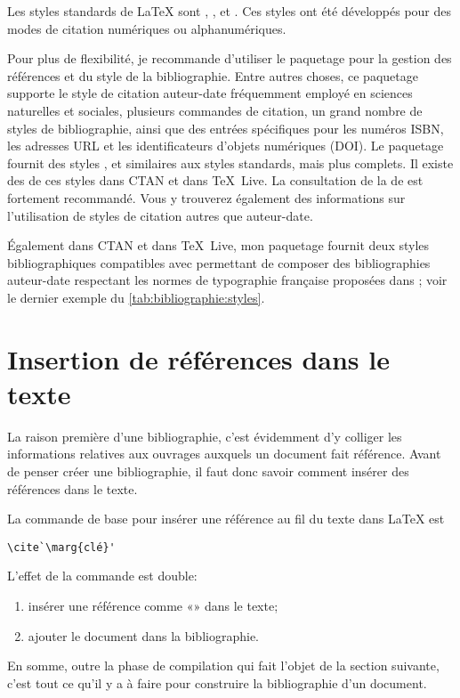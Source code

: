 Les styles standards de {\LaTeX} sont , ,
 et . Ces styles ont été développés pour des
modes de citation numériques ou alphanumériques.

Pour plus de flexibilité, je recommande d'utiliser le paquetage
 pour la gestion des références et du style de la
bibliographie. Entre autres choses, ce paquetage supporte le style de
citation auteur-date fréquemment employé en sciences naturelles et
sociales, plusieurs commandes de citation, un grand nombre de styles
de bibliographie, ainsi que des entrées spécifiques pour les numéros
ISBN, les adresses URL et les identificateurs d'objets numériques
(DOI). Le paquetage fournit des styles ,
 et  similaires aux styles standards,
mais plus complets. Il existe des %
de ces styles dans CTAN et dans {\TeX}~Live. La consultation de la %
de  est fortement recommandé. Vous y trouverez également
des informations sur l'utilisation de styles de citation autres que
auteur-date.

Également dans CTAN et dans {\TeX}~Live, mon paquetage
 \citep{francais-bst} fournit deux styles
bibliographiques compatibles avec  permettant de composer
des bibliographies auteur-date respectant les normes de typographie
française proposées dans \citet{Malo:1996}; voir le dernier exemple du
\autoref{tab:bibliographie:styles}.



\section{Insertion de références dans le texte}
\label{sec:bibliographie:cite}

La raison première d'une bibliographie, c'est évidemment d'y colliger
les informations relatives aux ouvrages auxquels un document fait
référence. Avant de penser créer une bibliographie, il faut donc
savoir comment insérer des références dans le texte.

La commande de base pour insérer une référence au fil du texte dans
{\LaTeX} est
\begin{lstlisting}
\cite`\marg{clé}'
\end{lstlisting}
L'effet de la commande est double:
\begin{enumerate}
\item insérer une référence comme «»
  dans le texte;
\item ajouter le document dans la bibliographie.
\end{enumerate}
En somme, outre la phase de compilation qui fait l'objet de la section
suivante, c'est tout ce qu'il y a à faire pour construire la
bibliographie d'un document.

